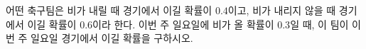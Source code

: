 어떤 축구팀은 비가 내릴 때 경기에서 이길 확률이 $0.4$이고, 비가 내리지 않을 때 경기에서 이길 확률이 $0.6$이라 한다. 이번 주 일요일에 비가 올 확률이 $0.3$일 때, 이 팀이 이번 주 일요일 경기에서 이길 확률을 구하시오.
